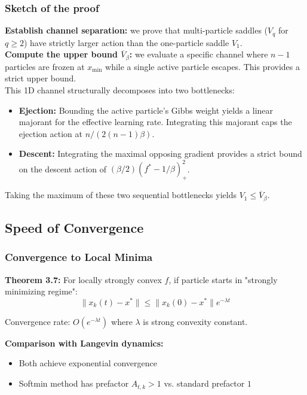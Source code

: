 \documentclass{beamer}
\newcommand{\prefactor}[2]{A_{#1,#2}}
\begin{document}
\begin{frame}\frametitle{Sketch of the proof}
    \textbf{Establish channel separation:} we prove that multi-particle saddles ($V_q$ for $q \ge 2$) have strictly larger action than the one-particle saddle $V_1$.\\
    \pause
    \textbf{Compute the upper bound $\overline{V}_\beta$:} we evaluate a specific channel where $n-1$ particles are frozen at $x_{\min}$ while a single active particle escapes. This provides a strict upper bound. \\
    \pause
    This 1D channel structurally decomposes into two bottlenecks:
    \begin{itemize}
        \item \textbf{Ejection:} Bounding the active particle's Gibbs weight yields a linear majorant for the effective learning rate. Integrating this majorant caps the ejection action at $n/(2(n-1)\beta)$.
        \pause
        \item \textbf{Descent:} Integrating the maximal opposing gradient provides a strict bound on the descent action of $(\beta/2)(f^* - 1/\beta)_+^2$.
    \end{itemize}
    Taking the maximum of these two sequential bottlenecks yields $V_1 \le \overline{V}_\beta$.
\end{frame}

\subsection{Speed of Convergence}
\begin{frame}

\frametitle{Convergence to Local Minima}

\textbf{Theorem 3.7:} For locally strongly convex $f$, if particle starts in "strongly minimizing regime":
$$\|x_k(t) - x^*\| \leq \|x_k(0) - x^*\| e^{-\lambda t}$$

Convergence rate: $O(e^{-\lambda t})$ where $\lambda$ is strong convexity constant.
\pause

\vspace{0.5cm}
\textbf{Comparison with Langevin dynamics:}
\begin{itemize}
  \item Both achieve exponential convergence
  \item Softmin method has prefactor $\prefactor{t}{k} > 1$ vs. standard prefactor $1$
\end{itemize}
\end{frame}
\end{document}
